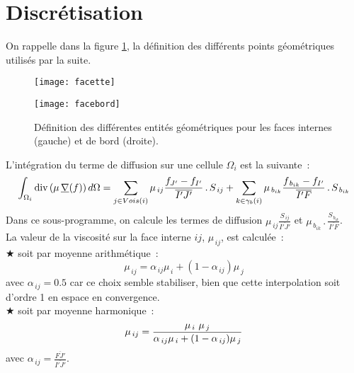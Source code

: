 \section*{Discrétisation} \label{Base_Viscfa_paragraphe2}
On rappelle dans la figure \ref{Base_Viscfa_fig_geom}, la définition des différents
points géométriques utilisés par la suite.

\begin{figure}[h]
\parbox{8cm}{%
\centerline{\texttt{[image: facette]}}}
\parbox{8cm}{%
\centerline{\texttt{[image: facebord]}}}
\caption{\label{Base_Viscfa_fig_geom}Définition des différentes entités
géométriques pour les faces internes (gauche) et de bord (droite).}
\end{figure}

L'intégration du terme de diffusion sur une cellule $\Omega_i$ est la suivante~:
\begin{equation}
\int_{\Omega_i}\text{div}\, (\mu\,\underline{\nabla}(f))\,d\Omega= \sum\limits_{j \in
Vois(i)}\mu_{\,ij} \frac{f_{J'}-f_{I'}}{\overline{I'J'}}\,.\, S_{\,ij} + \sum\limits_{k \in
\gamma_b(i)}\mu_{\,b_{ik}} \frac{f_{\,b_{ik}}- f_{I'}}{\overline{I'F}}\,.\,S_{\,b_{ik}}
\end{equation}
Dans ce sous-programme, on calcule les termes de diffusion
$\displaystyle \mu_{\,ij}\frac{S_{\,ij}}{\overline{I'J'}}$ et $\displaystyle
\mu_{\,b_{ik}}\,.\,\frac{S_{\,b_{ik}}}{\overline{I'F}}$.\\

La valeur de la viscosité sur la face interne $ij$, $\mu_{\,ij}$, est calculée~:\\
\hspace*{1.cm} {\tiny$\bigstar$}  soit par moyenne arithmétique~:
\begin{equation}
\mu_{\,ij}=\alpha_{\,ij}\mu_{\,i}+(1-\alpha_{\,ij})\mu_{\,j}
\end{equation}
avec $\alpha_{\,ij} = 0.5$ car ce choix semble stabiliser, bien que cette
interpolation soit d'ordre 1 en espace en convergence.\\
\hspace*{1.cm} {\tiny$\bigstar$} soit par moyenne harmonique~:
\begin{equation}\notag
\mu_{\,ij}=\frac{\mu_{\,i}\ \mu_{\,j}}{\alpha_{\,ij}\mu_{\,i}+(1-\alpha_{\,ij})\mu_{\,j}}
\end{equation}
avec $\alpha_{\,ij}=\displaystyle \frac{\overline{FJ'}}{\overline{I'J'}}$.\\

